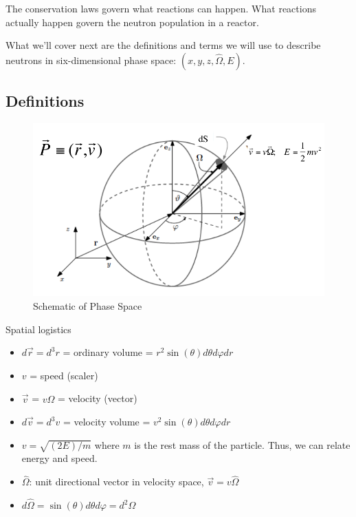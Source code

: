 \documentclass[12pt]{article}
\newcommand{\vOmega}{\ensuremath{\hat{\Omega}}}
\begin{document}
The conservation laws govern what reactions can happen. What reactions actually happen govern the neutron population in a reactor. 

What we'll cover next are the definitions and terms we will use to describe neutrons in six-dimensional phase space: $(x,y,z,\vOmega, E)$.

\subsection*{Definitions}

\begin{figure}[h!]
    \begin{center}
    \includegraphics[keepaspectratio, width = 4 in]{../figs/phase-space}
    \end{center}
    \caption{Schematic of Phase Space}
    \label{fig:phase_space}
\end{figure}

Spatial logistics
\begin{itemize}
\item $d\vec{r} = d^3r$ = ordinary volume = $r^2 \sin(\theta) d\theta d\varphi dr$
%
\item $v$ = speed (scaler)
\item $\vec{v}$ = $v\vOmega$ = velocity (vector)
\item $d\vec{v} = d^3v$ = velocity volume = $v^2 \sin(\theta)d\theta d\varphi dr$
\item $v = \sqrt{(2E)/m}$ where $m$ is the rest mass of the particle. Thus, we can relate energy and speed.

\item $\vOmega$: unit directional vector in velocity space, $\vec{v} = v\vOmega$
\item $d\vOmega = \sin(\theta)d\theta d\varphi =  d^2\Omega$
\end{itemize}
\end{document}
